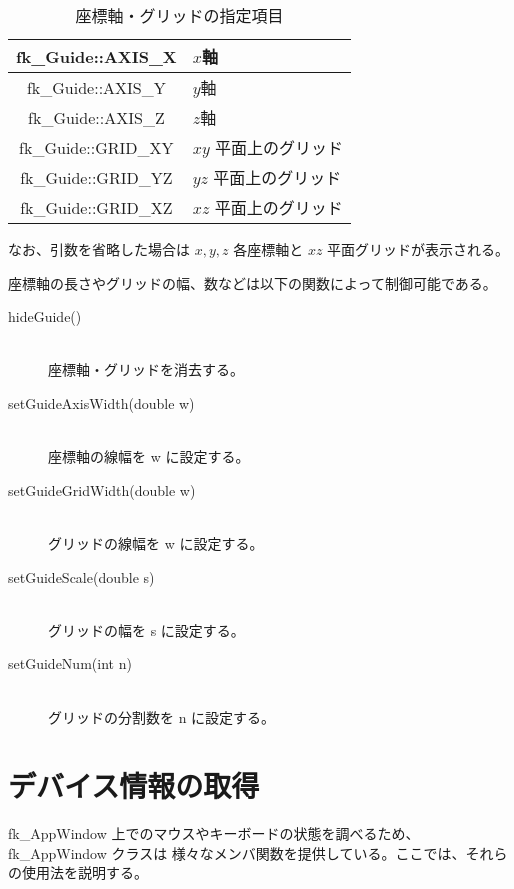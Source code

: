 \begin{table}[H]
\caption{座標軸・グリッドの指定項目}
\label{tbl:fkAxisGrid}
\begin{center}
\begin{tabular}{|c|l|}
\hline
fk\_Guide::AXIS\_X & \(x\)軸 \\ \hline
fk\_Guide::AXIS\_Y & \(y\)軸 \\ \hline
fk\_Guide::AXIS\_Z & \(z\)軸 \\ \hline
fk\_Guide::GRID\_XY & \(xy\) 平面上のグリッド \\ \hline
fk\_Guide::GRID\_YZ & \(yz\) 平面上のグリッド \\ \hline
fk\_Guide::GRID\_XZ & \(xz\) 平面上のグリッド \\ \hline
\end{tabular}
\end{center}
\end{table}

なお、引数を省略した場合は \(x,y,z\) 各座標軸と \(xz\) 平面グリッドが表示される。

座標軸の長さやグリッドの幅、数などは以下の関数によって制御可能である。

\begin{description}
\item[hideGuide()] ~ \\
	座標軸・グリッドを消去する。\\

\item[setGuideAxisWidth(double w)] ~ \\
	座標軸の線幅を w に設定する。\\

\item[setGuideGridWidth(double w)] ~ \\
	グリッドの線幅を w に設定する。\\

\item[setGuideScale(double s)] ~ \\
	グリッドの幅を s に設定する。\\

\item[setGuideNum(int n)] ~ \\
	グリッドの分割数を n に設定する。
\end{description}

\section{デバイス情報の取得} \label{sec:device}
fk\_AppWindow 上でのマウスやキーボードの状態を調べるため、fk\_AppWindow クラスは
様々なメンバ関数を提供している。ここでは、それらの使用法を説明する。
